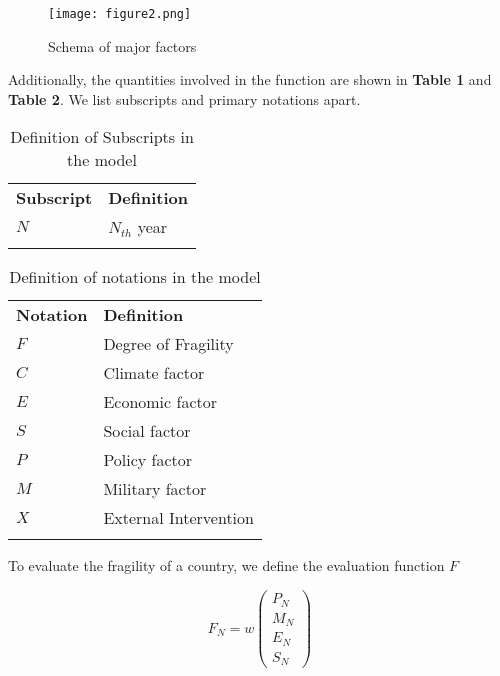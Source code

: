 \documentclass{mcmthesis}
\newlength\savedwidth
\newcommand\whline{\noalign{\global\savedwidth\arrayrulewidth
		\global\arrayrulewidth 1.2pt}%
	\hline
	\noalign{\global\arrayrulewidth\savedwidth}}
\newlength\savewidth
\newcommand\shline{\noalign{\global\savewidth\arrayrulewidth
		\global\arrayrulewidth 1.2pt}%
	\hline
	\noalign{\global\arrayrulewidth\savewidth}}
\begin{document}
	\begin{figure}[h]
		\small
		\centering
		\texttt{[image: figure2.png]}
		\caption{Schema of major factors} \label{fig:Schema of major factors}
	\end{figure}
	
	\noindent Additionally, the quantities involved in the function are shown in \textbf{Table 1} and \textbf{Table 2}. We list subscripts and primary notations apart.\\
	
	\begin{table}[htbp]
		\renewcommand\arraystretch{1.5}
		\footnotesize
		\centering
		\begin{tabular}{m{3cm}<{\centering}|m{10cm}<{\centering}}
			\whline
			\textbf{Subscript}&\textbf{Definition}\\
			\whline 
			$N$&$N_{th}$ year\\ 
			\shline
		\end{tabular}
		\caption{Definition of Subscripts in the model}\label{tab:Definition of Subscripts in the model}
	\end{table}
	\begin{table}[htbp]
		\renewcommand\arraystretch{1.5}
		\footnotesize
		\centering
		\begin{tabular}{m{3cm}<{\centering}|m{10cm}<{\centering}}
			\whline
			\textbf{Notation}&\textbf{Definition}\\
			\whline 
			$F$&Degree of Fragility\\
			$C$&Climate factor\\
			$E$&Economic factor\\
			$S$&Social factor\\
			$P$&Policy factor\\ 
			$M$&Military factor\\
			$X$&External Intervention\\
			\shline
		\end{tabular}
		\caption{Definition of notations in the model}\label{tab:Definition of notations in the model}
	\end{table}
	
	To evaluate the fragility of a country, we define the evaluation function $F$
	
	\begin{equation}
	F_N = w 
	\left(
	\begin{matrix}
	P_N \\ M_N \\ E_N \\ S_N
	\end{matrix}
	\right)
	\end{equation}
	
\end{document}
